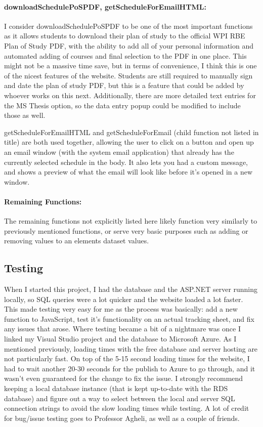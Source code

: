 \documentclass[12pt]{article}
\begin{document}
				\paragraph{downloadSchedulePoSPDF, getScheduleForEmailHTML:}
					I consider downloadSchedulePoSPDF to be one of the most important functions as it allows students to download their plan of study to the official WPI RBE Plan of Study PDF, with the ability to add all of your personal information and automated adding of courses and final selection to the PDF in one place. This might not be a massive time save, but in terms of convenience, I think this is one of the nicest features of the website. Students are still required to manually sign and date the plan of study PDF, but this is a feature that could be added by whoever works on this next. Additionally, there are more detailed text entries for the MS Thesis option, so the data entry popup could be modified to include those as well.
					\par
					getScheduleForEmailHTML and getScheduleForEmail (child function not listed in title) are both used together, allowing the user to click on a button and open up an email window (with the system email application) that already has the currently selected schedule in the body. It also lets you had a custom message, and shows a preview of what the email will look like before it's opened in a new window.
				\paragraph{Remaining Functions:}
					The remaining functions not explicitly listed here likely function very similarly to previously mentioned functions, or serve very basic purposes such as adding or removing values to an elements dataset values.
				
		\subsection{Testing}
			When I started this project, I had the database and the ASP.NET server running locally, so SQL queries were a lot quicker and the website loaded a lot faster. This made testing very easy for me as the process was basically: add a new function to JavaScript, test it's functionality on an actual tracking sheet, and fix any issues that arose. Where testing became a bit of a nightmare was once I linked my Visual Studio project and the database to Microsoft Azure. As I mentioned previously, loading times with the free database and server hosting are not particularly fast. On top of the 5-15 second loading times for the website, I had to wait another 20-30 seconds for the publish to Azure to go through, and it wasn't even guaranteed for the change to fix the issue. I strongly recommend keeping a local database instance (that is kept up-to-date with the RDS database) and figure out a way to select between the local and server SQL connection strings to avoid the slow loading times while testing. A lot of credit for bug/issue testing goes to Professor Agheli, as well as a couple of friends.
	
\end{document}
